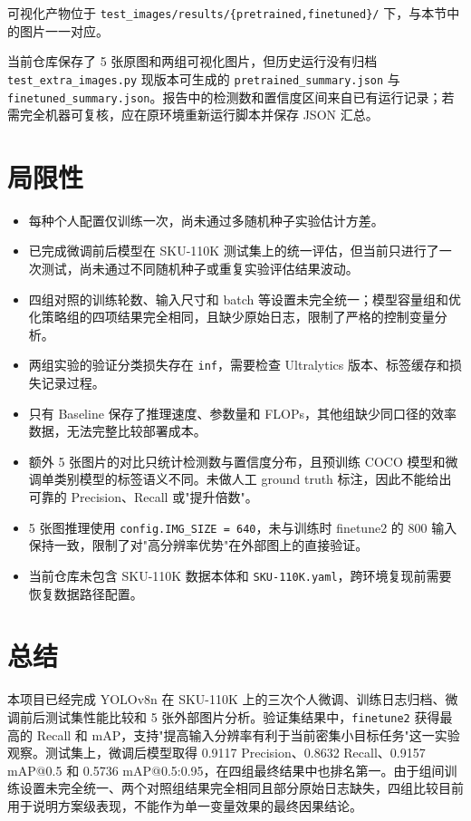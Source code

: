 \documentclass[12pt,a4paper]{ctexart}
\begin{document}
可视化产物位于 \texttt{test\_images/results/\{pretrained,finetuned\}/} 下，与本节中的图片一一对应。

当前仓库保存了 5 张原图和两组可视化图片，但历史运行没有归档 \texttt{test\_extra\_images.py} 现版本可生成的 \texttt{pretrained\_summary.json} 与 \texttt{finetuned\_summary.json}。报告中的检测数和置信度区间来自已有运行记录；若需完全机器可复核，应在原环境重新运行脚本并保存 JSON 汇总。

\section{局限性}

\begin{itemize}[itemsep=2pt]
    \item 每种个人配置仅训练一次，尚未通过多随机种子实验估计方差。
    \item 已完成微调前后模型在 SKU-110K 测试集上的统一评估，但当前只进行了一次测试，尚未通过不同随机种子或重复实验评估结果波动。
    \item 四组对照的训练轮数、输入尺寸和 batch 等设置未完全统一；模型容量组和优化策略组的四项结果完全相同，且缺少原始日志，限制了严格的控制变量分析。
    \item 两组实验的验证分类损失存在 \texttt{inf}，需要检查 Ultralytics 版本、标签缓存和损失记录过程。
    \item 只有 Baseline 保存了推理速度、参数量和 FLOPs，其他组缺少同口径的效率数据，无法完整比较部署成本。
    \item 额外 5 张图片的对比只统计检测数与置信度分布，且预训练 COCO 模型和微调单类别模型的标签语义不同。未做人工 ground truth 标注，因此不能给出可靠的 Precision、Recall 或"提升倍数"。
    \item 5 张图推理使用 \texttt{config.IMG\_SIZE = 640}，未与训练时 finetune2 的 800 输入保持一致，限制了对"高分辨率优势"在外部图上的直接验证。
    \item 当前仓库未包含 SKU-110K 数据本体和 \texttt{SKU-110K.yaml}，跨环境复现前需要恢复数据路径配置。
\end{itemize}

\section{总结}

本项目已经完成 YOLOv8n 在 SKU-110K 上的三次个人微调、训练日志归档、微调前后测试集性能比较和 5 张外部图片分析。验证集结果中，\texttt{finetune2} 获得最高的 Recall 和 mAP，支持"提高输入分辨率有利于当前密集小目标任务"这一实验观察。测试集上，微调后模型取得 0.9117 Precision、0.8632 Recall、0.9157 mAP@0.5 和 0.5736 mAP@0.5:0.95，在四组最终结果中也排名第一。由于组间训练设置未完全统一、两个对照组结果完全相同且部分原始日志缺失，四组比较目前用于说明方案级表现，不能作为单一变量效果的最终因果结论。
\end{document}

